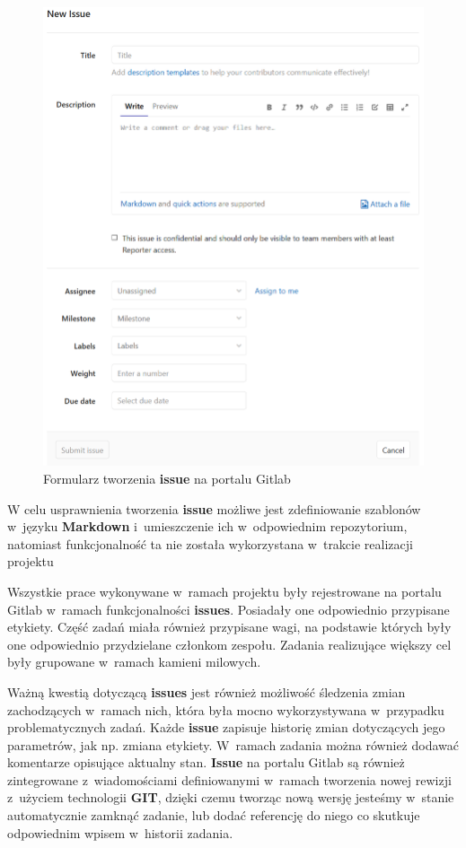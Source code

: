 \begin{figure}[H]
\centering
\caption{Formularz tworzenia \textbf{issue} na portalu Gitlab}
\label{fig:newIssue}
\includegraphics[width=\textwidth]{res/png/newIssue}
\end{figure}

W celu usprawnienia tworzenia \textbf{issue} możliwe jest zdefiniowanie szablonów w~języku \textbf{Markdown} i~umieszczenie ich w~odpowiednim repozytorium, natomiast funkcjonalność ta nie została wykorzystana w~trakcie realizacji projektu

\newpage

Wszystkie prace wykonywane w~ramach projektu były rejestrowane na portalu Gitlab w~ramach funkcjonalności \textbf{issues}. Posiadały one odpowiednio przypisane etykiety. Część zadań miała również przypisane wagi, na podstawie których były one odpowiednio przydzielane członkom zespołu. Zadania realizujące większy cel były grupowane w~ramach kamieni milowych.

Ważną kwestią dotyczącą \textbf{issues} jest również możliwość śledzenia zmian zachodzących w~ramach nich, która była mocno wykorzystywana w~przypadku problematycznych zadań. Każde \textbf{issue} zapisuje historię zmian dotyczących jego parametrów, jak np. zmiana etykiety. W~ramach zadania można również dodawać komentarze opisujące aktualny stan. \textbf{Issue} na portalu Gitlab są również zintegrowane z~wiadomościami definiowanymi w~ramach tworzenia nowej rewizji z~użyciem technologii \textbf{GIT}, dzięki czemu tworząc nową wersję jesteśmy w~stanie automatycznie zamknąć zadanie, lub dodać referencję do niego co skutkuje odpowiednim wpisem w~historii zadania.


